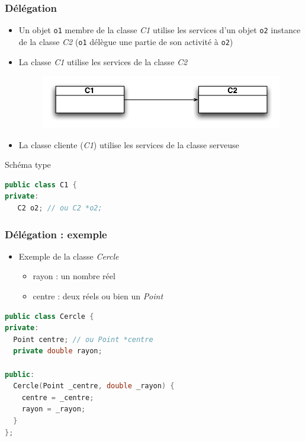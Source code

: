 \begin{frame}[fragile]
\frametitle{Délégation}
\begin{itemize}
	\item Un objet \texttt{o1} membre de la classe \emph{C1} utilise les services d'un objet \texttt{o2} instance de la classe \emph{C2} (\texttt{o1} délègue une partie de son activité à \texttt{o2})
	\item La classe \emph{C1} utilise les services de la classe \emph{C2}
\begin{figure}[htbp]
    \begin{center}
      \includegraphics[scale=.5]{fig/delegation.pdf}
    \end{center}
  \end{figure}
  \item La classe cliente (\emph{C1}) utilise les services de la classe serveuse
\end{itemize}
\begin{block}{Schéma type}
\begin{lstlisting}[language=C++]
public class C1 {
private:
   C2 o2; // ou C2 *o2;
\end{lstlisting}
\end{block}
\end{frame}

\begin{frame}[fragile]
\frametitle{Délégation : exemple}
\begin{itemize}
  \item Exemple de la classe \emph{Cercle}
  \begin{itemize}
  	\item rayon : un nombre réel
	\item centre : deux réels ou bien un \emph{Point}
  \end{itemize}
\end{itemize}
\begin{lstlisting}[language=C++]
public class Cercle {
private:
  Point centre; // ou Point *centre
  private double rayon;

public:
  Cercle(Point _centre, double _rayon) {
    centre = _centre;
    rayon = _rayon;
  }
};
\end{lstlisting}
\end{frame}

